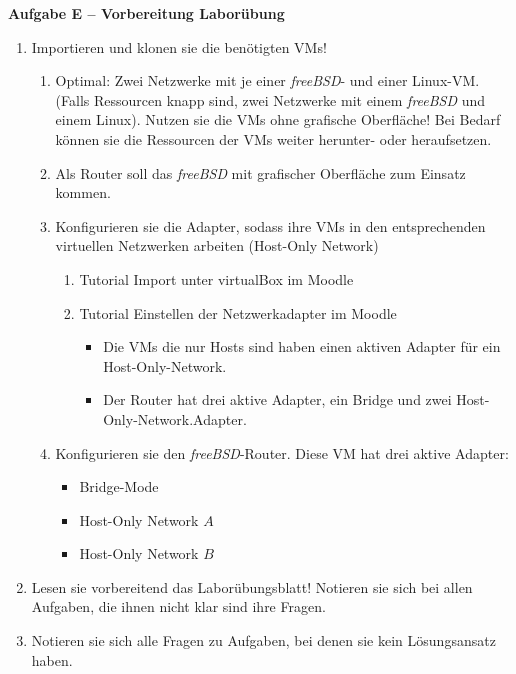 \documentclass[paper=a4,fontsize=11pt]{scrartcl}%
\numberwithin{equation}{section}
\begin{document}
\begin{center}
\Large{\textbf{Aufgabe E -- Vorbereitung Laborübung}}
\end{center}
\vskip0.25in
\begin{enumerate}
	\item Importieren und klonen sie die benötigten VMs!
	\begin{enumerate}
		\item Optimal: Zwei Netzwerke mit je einer \emph{freeBSD}- und einer Linux-VM. (Falls Ressourcen knapp sind, zwei Netzwerke mit einem \emph{freeBSD} und einem Linux). Nutzen sie die VMs ohne grafische Oberfläche! Bei Bedarf können sie die Ressourcen der VMs weiter herunter- oder heraufsetzen.
		\item Als Router soll das \emph{freeBSD} mit grafischer Oberfläche zum Einsatz kommen.
		\item Konfigurieren sie die Adapter, sodass ihre VMs in den entsprechenden virtuellen Netzwerken arbeiten (Host-Only Network)
		\begin{enumerate}
			\item Tutorial Import unter virtualBox im Moodle
			\item Tutorial Einstellen der Netzwerkadapter im Moodle
			\begin{itemize}
				\item Die VMs die nur Hosts sind haben einen aktiven Adapter für ein Host-Only-Network.
				\item Der Router hat drei aktive Adapter, ein Bridge und zwei Host-Only-Network.Adapter.
			\end{itemize}
		\end{enumerate}
		\item Konfigurieren sie den \emph{freeBSD}-Router. Diese VM hat drei aktive Adapter: 
		\begin{itemize}
			\item Bridge-Mode
			\item Host-Only Network $A$
			\item Host-Only Network $B$
		\end{itemize}
	\end{enumerate}
	\item Lesen sie vorbereitend das Laborübungsblatt! Notieren sie sich bei allen Aufgaben, die ihnen nicht klar sind ihre Fragen. 
	\item Notieren sie sich alle Fragen zu Aufgaben, bei denen sie kein Lösungsansatz haben.
\end{enumerate}

\printbibliography
\end{document}
